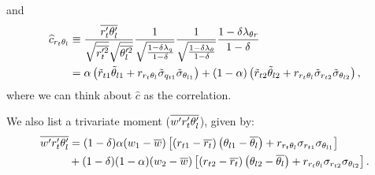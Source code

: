 and
\begin{align}
    \widehat{c}_{r_t \theta_l}
    &\equiv \frac{\overline{r_t' \theta_l'}}{\sqrt{\overline{r_t'^2}}\sqrt{\overline{\theta_l'^2}}}
    \frac{1}{\sqrt{\frac{1-\delta \lambda_q}{1-\delta}}}
    \frac{1}{\sqrt{\frac{1-\delta \lambda_\theta}{1-\delta}}}
    \frac{1 - \delta \lambda_{\theta r} }{1 - \delta} \nonumber\\
    &= \alpha \left(\tilde{r}_{t1} \tilde{\theta}_{l1} +
    r_{r_t \theta_l} \tilde{\sigma}_{q_{t1}} \tilde{\sigma}_{\theta_{l1}} \right) +
    (1 - \alpha) \left(\tilde{r}_{t2} \tilde{\theta}_{l2} +
    r_{r_t \theta_l} \tilde{\sigma}_{r_{t2}} \tilde{\sigma}_{\theta_{l2}} \right),
    \label{eq:c_hat_r_t_theta_l_nondim}
\end{align}
where we can think about $\widehat{c}$ as the correlation.

We also list a trivariate moment ($\overline{w' r_t' \theta_l'}$), given by:
\begin{align}
    \overline{w' r_t' \theta_l'}
    &= (1 - \delta) \alpha (w_1 - \overline{w}) \left[
        \left(r_{t1} - \overline{r_t}\right)
        \left(\theta_{l1} - \overline{\theta_l}\right) +
        r_{r_t \theta_l} \sigma_{r_{t1}} \sigma_{\theta_{l1}}
        \right] \nonumber\\
    &+ (1 - \delta) (1 - \alpha) (w_2 - \overline{w}) \left[
        \left(r_{t2} - \overline{r_t}\right)
        \left(\theta_{l2} - \overline{\theta_l}\right) +
        r_{r_t \theta_l} \sigma_{r_{t2}} \sigma_{\theta_{l2}}
    \right].
    \label{eq:w_prime_r_t_prime_t_l_prime_bar}
\end{align}